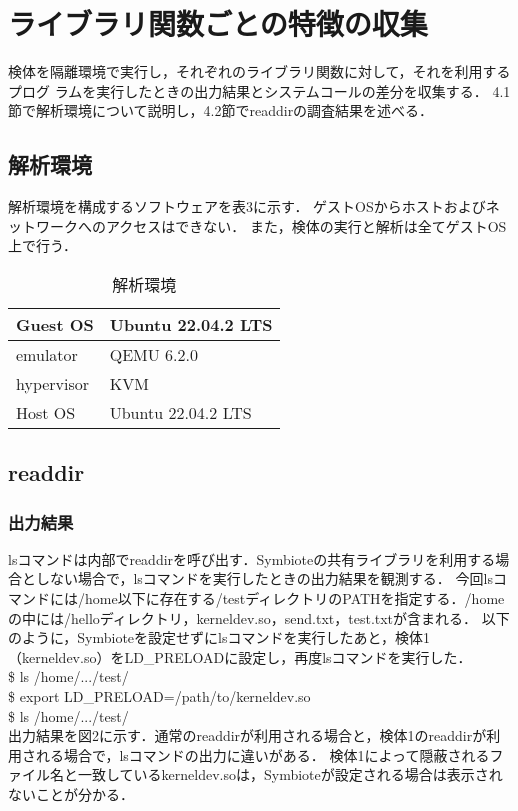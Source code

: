 \documentclass[submit,techreq,noauthor]{eco}	%
\begin{document}
\section{ライブラリ関数ごとの特徴の収集}
検体を隔離環境で実行し，それぞれのライブラリ関数に対して，それを利用するプログ
ラムを実行したときの出力結果とシステムコールの差分を収集する．
\indent
4.1節で解析環境について説明し，4.2節でreaddirの調査結果を述べる．

\subsection{解析環境}
解析環境を構成するソフトウェアを表3に示す．
ゲストOSからホストおよびネットワークへのアクセスはできない．
また，検体の実行と解析は全てゲストOS上で行う．



\begin{table}[t]
  \caption{解析環境}
  \label{table: 解析環境}
  \centering
  \begin{tabular}{|l|l|}
  \hline
  Guest OS   & Ubuntu 22.04.2 LTS \\ \hline
  emulator   & QEMU 6.2.0         \\ \hline
  hypervisor & KVM                \\ \hline
  Host OS    & Ubuntu 22.04.2 LTS \\ \hline
  \end{tabular}
\end{table}



\subsection{readdir}
\subsubsection{出力結果}
lsコマンドは内部でreaddirを呼び出す．Symbioteの共有ライブラリを利用する場合としない場合で，lsコマンドを実行したときの出力結果を観測する．
今回lsコマンドには/home以下に存在する/testディレクトリのPATHを指定する．/homeの中には/helloディレクトリ，kerneldev.so，send.txt，test.txtが含まれる．
以下のように，Symbioteを設定せずにlsコマンドを実行したあと，検体1（kerneldev.so）をLD\_PRELOADに設定し，再度lsコマンドを実行した．\\
\$ ls /home/.../test/\\
\$ export LD\_PRELOAD=/path/to/kerneldev.so\\
\$ ls /home/.../test/\\
出力結果を図2に示す．通常のreaddirが利用される場合と，検体1のreaddirが利用される場合で，lsコマンドの出力に違いがある．
検体1によって隠蔽されるファイル名と一致しているkerneldev.soは，Symbioteが設定される場合は表示されないことが分かる．\\
\end{document}
